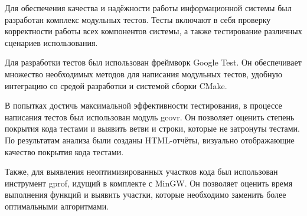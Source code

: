 Для обеспечения качества и надёжности работы информационной системы был разработан комплекс модульных тестов. Тесты включают в себя проверку корректности работы всех компонентов системы, а также тестирование различных сценариев использования.

Для разработки тестов был использован фреймворк Google Test. Он обеспечивает множество необходимых методов для написания модульных тестов, удобную интеграцию со средой разработки и системой сборки CMake.

В попытках достичь максимальной эффективности тестирования, в процессе написания тестов был использован модуль gcovr. Он позволяет оценить степень покрытия кода тестами и выявить ветви и строки, которые не затронуты тестами. По результатам анализа были созданы HTML-отчёты, визуально отображающие качество покрытия кода тестами.

Также, для выявления неоптимизированных участков кода был использован инструмент gprof, идущий в комплекте с MinGW. Он позволяет оценить время выполнения функций и выявить участки, которые необходимо заменить более оптимальными алгоритмами.
